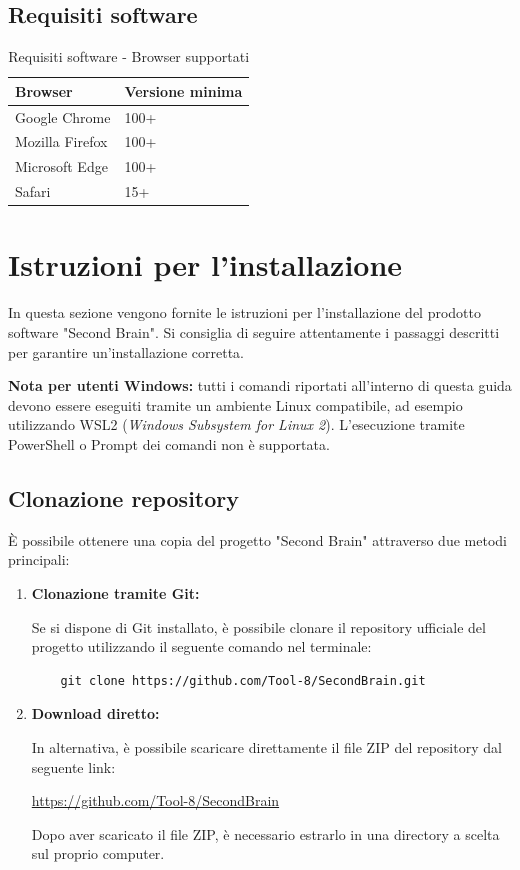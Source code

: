 \documentclass[a4paper,10pt]{article}
\begin{document}
\subsection{Requisiti software}
\begin{table}[H]
\centering
\renewcommand{\arraystretch}{1.3}
\begin{tabular}{|l|l|}
\hline
\textbf{Browser} & \textbf{Versione minima} \\ \hline

Google Chrome & 100+ \\ 
Mozilla Firefox & 100+ \\ 
Microsoft Edge & 100+ \\ 
Safari & 15+ \\ \hline

\end{tabular}
\caption{Requisiti software - Browser supportati}
\end{table}

\section{Istruzioni per l'installazione}
In questa sezione vengono fornite le istruzioni per l'installazione del prodotto software "Second Brain". Si consiglia di seguire attentamente i passaggi descritti per garantire un'installazione corretta.

\textbf{Nota per utenti Windows:} tutti i comandi riportati all'interno di questa guida devono essere eseguiti tramite un ambiente Linux compatibile, ad esempio utilizzando WSL2 (\textit{Windows Subsystem for Linux 2}). L'esecuzione tramite PowerShell o Prompt dei comandi non è supportata.

\subsection{Clonazione repository}
È possibile ottenere una copia del progetto "Second Brain" attraverso due metodi principali:
\begin{enumerate}
  \item \textbf{Clonazione tramite Git:}
  
  Se si dispone di Git installato, è possibile clonare il repository ufficiale del progetto utilizzando il seguente comando nel terminale:

  \begin{lstlisting}
    git clone https://github.com/Tool-8/SecondBrain.git
  \end{lstlisting}
  \item \textbf{Download diretto:}
  
  In alternativa, è possibile scaricare direttamente il file ZIP del repository dal seguente link:

  \begin{center}
    \url{https://github.com/Tool-8/SecondBrain}
  \end{center}

  Dopo aver scaricato il file ZIP, è necessario estrarlo in una directory a scelta sul proprio computer.

\end{enumerate}
\end{document}
